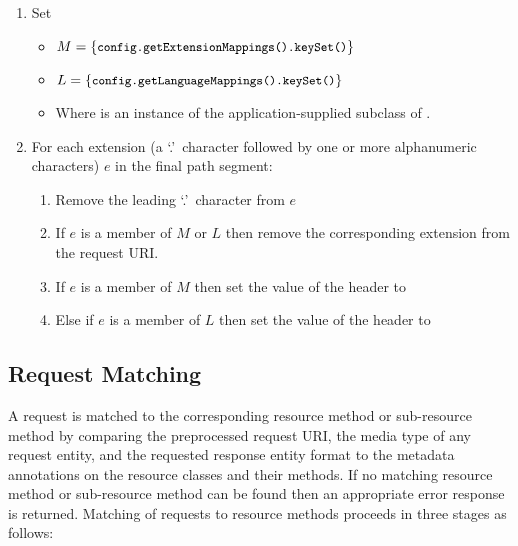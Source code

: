 \begin{enumerate}
\item Set
\begin{itemize}
\item $M = \{\mbox{\texttt{\small config.getExtensionMappings().keySet()}}\}$
\item $L = \{\mbox{\texttt{\small config.getLanguageMappings().keySet()}}\}$
\item Where  is an instance of the application-supplied subclass of .
\end{itemize}
\item For each extension (a \lq.\rq\ character followed by one or more alphanumeric characters) $e$ in the final path segment:
\begin{enumerate}
\item Remove the leading \lq.\rq\ character from $e$
\item If $e$ is a member of $M$ or $L$ then remove the corresponding extension from the request URI.
\item If $e$ is a member of $M$ then set the value of the  header to 
\item Else if $e$ is a member of $L$ then set the value of the  header to 
\end{enumerate}
\end{enumerate}

\subsection{Request Matching}

A request is matched to the corresponding resource method or sub-resource method by comparing the preprocessed request URI, the media type of any request entity, and the requested response entity format to the metadata annotations on the resource classes and their methods. If no matching resource method or sub-resource method can be found then an appropriate error response is returned. Matching of requests to resource methods proceeds in three stages as follows:

